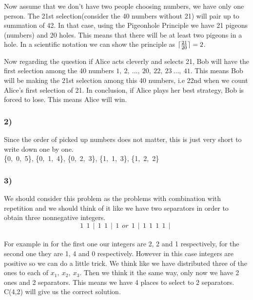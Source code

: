 \documentclass[12pt]{article}
\DeclarePairedDelimiter{\ceil}{\lceil}{\rceil}
\begin{document}
\hspace{0.5cm}Now assume that we don't have two people choosing numbers, we have only one person. The 21st selection(consider the 40 numbers without 21) will pair up to summation of 42. In that case, using the Pigeonhole Principle we have 21 pigeons (numbers) and 20 holes. This means that there will be at least two pigeons in a hole. In a scientific notation we can show the principle as $\ceil{\frac{21}{20}}=2$. 

\hspace{0.5cm}Now regarding the question if Alice acts cleverly and selects 21, Bob will have the first selection among the 40 numbers $1,\ 2,\ ...,\ 20,\ 22,\ 23 \ ...,\ 41$. This means Bob will be making the 21st selection among this 40 numbers, i.e 22nd when we count Alice's first selection of 21. In conclusion, if Alice plays her best strategy, Bob is forced to lose. This means Alice will win.

\subsubsection*{2)}
Since the order of picked up numbers does not matter, this is just very short to write down one by one.\\
\{0,\ 0,\ 5\}, \{0,\ 1,\ 4\}, \{0,\ 2,\ 3\}, \{1,\ 1,\ 3\}, \{1,\ 2,\ 2\}

\subsubsection*{3)}
We should consider this problem as the problems with combination with repetition and we should think of it like we have two separators in order to obtain three nonnegative integers. $$1\ \ 1\ \ |\ \ 1\ \ 1\ \ |\ \ 1\ \ or\ \ 1\ \ |\ \ 1\ \  1\ \ 1\ \ 1\ \ |\ \ $$ \\
For example in for the first one our integers are 2, 2 and 1 respectively, for the second one they are 1, 4 and 0 respectively. However in this case integers are positive so we can do a little trick. We think like we have distributed three of the ones to each of $x_1,\ x_2,\ x_3$. Then we think it the same way, only now we have 2 ones and 2 separators. This means we have 4 places to select to 2 separators. C(4,2) will give us the correct solution.
\end{document}
